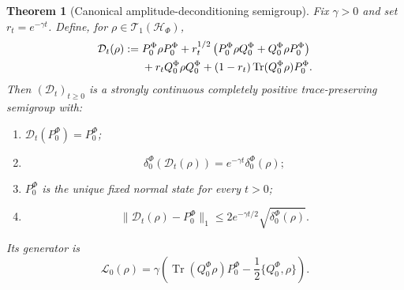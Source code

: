 \documentclass[11pt,reqno]{scrartcl}
\newcommand{\scrHF}{\mathscr H_{\Phi}}
\newcommand{\PzeroF}{P_{0}^{\Phi}}
\newcommand{\QzeroF}{Q_{0}^{\Phi}}
\DeclareMathOperator{\Tr}{Tr}
\theoremstyle{plain}
\newtheorem{theorem}{Theorem}[section]
\theoremstyle{definition}
\theoremstyle{remark}
\begin{document}
\begin{theorem}[Canonical amplitude-deconditioning semigroup]
\label{thm:canonical-deconditioning-semigroup}
Fix $\gamma>0$ and set $r_t=e^{-\gamma t}$.  Define, for
$\rho\in\mathcal T_1(\scrHF)$,
\begin{align}
  \mathcal D_t(\rho)
  :={}&\PzeroF\rho\PzeroF
  +r_t^{1/2}
   \left(\PzeroF\rho\QzeroF+\QzeroF\rho\PzeroF\right)
  \notag\\
  &+r_t\QzeroF\rho\QzeroF
  +(1-r_t)\Tr(\QzeroF\rho)\PzeroF.
  \label{eq:canonical-deconditioning-channel}
\end{align}
Then $(\mathcal D_t)_{t\geq0}$ is a strongly continuous completely positive
trace-preserving semigroup with:
\begin{enumerate}[label=(\roman*)]
  \item $\mathcal D_t(\PzeroF)=\PzeroF$;
  \item
  \begin{equation}
    \delta_0^{\Phi}(\mathcal D_t(\rho))
    =e^{-\gamma t}\delta_0^{\Phi}(\rho);
    \label{eq:deconditioning-exact-contraction}
  \end{equation}
  \item $\PzeroF$ is the unique fixed normal state for every $t>0$;
  \item
  \begin{equation}
    \|\mathcal D_t(\rho)-\PzeroF\|_1
    \leq
    2e^{-\gamma t/2}\sqrt{\delta_0^{\Phi}(\rho)}.
    \label{eq:deconditioning-trace-distance-bound}
  \end{equation}
\end{enumerate}
Its generator is
\begin{equation}
  \boxed{
  \mathcal L_0(\rho)
  =\gamma\left(
      \Tr(\QzeroF\rho)\PzeroF
      -\frac12\{\QzeroF,\rho\}
    \right).}
  \label{eq:deconditioning-generator}
\end{equation}
\end{theorem}
\end{document}
